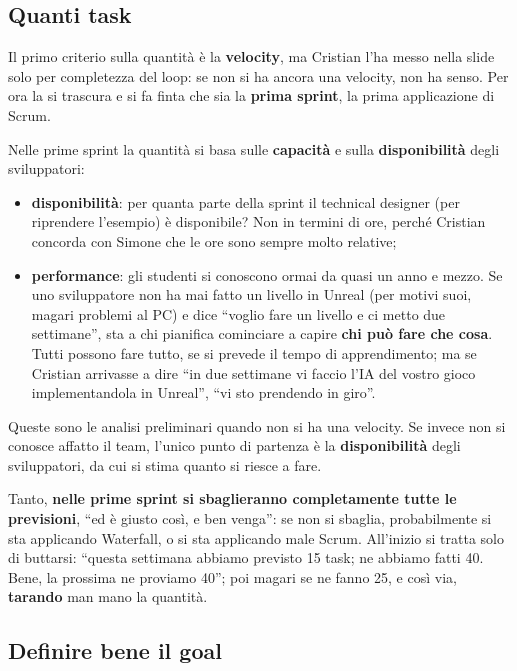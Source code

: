 \subsection{Quanti task}

Il primo criterio sulla quantità è la \textbf{velocity}, ma Cristian l'ha
messo nella slide solo per completezza del loop: se non si ha ancora una
velocity, non ha senso. Per ora la si trascura e si fa finta che sia la
\textbf{prima sprint}, la prima applicazione di Scrum.

Nelle prime sprint la quantità si basa sulle \textbf{capacità} e sulla
\textbf{disponibilità} degli sviluppatori:
\begin{itemize}
  \item \textbf{disponibilità}: per quanta parte della sprint il technical
        designer (per riprendere l'esempio) è disponibile? Non in termini di
        ore, perché Cristian concorda con Simone che le ore sono sempre molto
        relative;
  \item \textbf{performance}: gli studenti si conoscono ormai da quasi un
        anno e mezzo. Se uno sviluppatore non ha mai fatto un livello in
        Unreal (per motivi suoi, magari problemi al PC) e dice ``voglio fare
        un livello e ci metto due settimane'', sta a chi pianifica cominciare
        a capire \textbf{chi può fare che cosa}. Tutti possono fare tutto, se
        si prevede il tempo di apprendimento; ma se Cristian arrivasse a dire
        ``in due settimane vi faccio l'IA del vostro gioco implementandola in
        Unreal'', ``vi sto prendendo in giro''.
\end{itemize}
Queste sono le analisi preliminari quando non si ha una velocity. Se invece
non si conosce affatto il team, l'unico punto di partenza è la
\textbf{disponibilità} degli sviluppatori, da cui si stima quanto si riesce a
fare.

Tanto, \textbf{nelle prime sprint si sbaglieranno completamente tutte le
previsioni}, ``ed è giusto così, e ben venga'': se non si sbaglia,
probabilmente si sta applicando Waterfall, o si sta applicando male Scrum.
All'inizio si tratta solo di buttarsi: ``questa settimana abbiamo previsto 15
task; ne abbiamo fatti 40. Bene, la prossima ne proviamo 40''; poi magari se ne
fanno 25, e così via, \textbf{tarando} man mano la quantità.

\subsection{Definire bene il goal}


